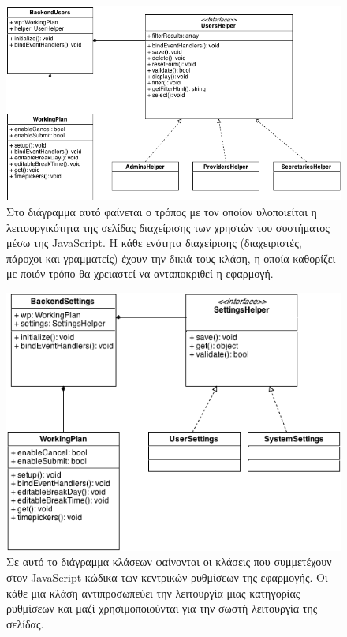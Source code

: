 \begin{figure}
\centering
\includegraphics[width=150mm]{images/cd-backend-users.png}
\caption{Στο διάγραμμα αυτό φαίνεται ο τρόπος με τον οποίον υλοποιείται η λειτουργικότητα της σελίδας διαχείρισης των χρηστών του συστήματος μέσω της JavaScript. Η κάθε ενότητα διαχείρισης (διαχειριστές, πάροχοι και γραμματείς) έχουν την δικιά τους κλάση, η οποία καθορίζει με ποιόν τρόπο θα χρειαστεί να ανταποκριθεί η εφαρμογή.}
\label{cd-backend-users}
\end{figure}

\begin{figure}
\centering
\includegraphics[width=150mm]{images/cd-backend-settings.png}
\caption{Σε αυτό το διάγραμμα κλάσεων φαίνονται οι κλάσεις που συμμετέχουν στον JavaScript κώδικα των κεντρικών ρυθμίσεων της εφαρμογής. Οι κάθε μια κλάση αντιπροσωπεύει την λειτουργία μιας κατηγορίας ρυθμίσεων και μαζί χρησιμοποιούνται για την σωστή λειτουργία της σελίδας.}
\label{cd-backend-settings}
\end{figure}

